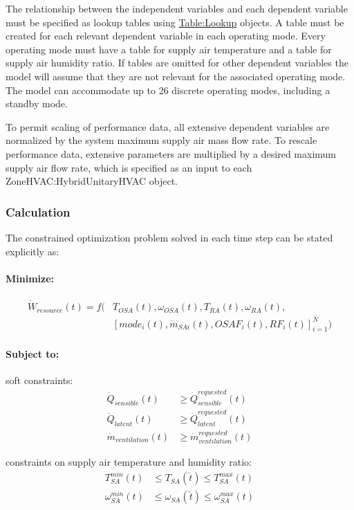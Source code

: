 The relationship between the independent variables and each dependent variable must be specified as lookup tables using \hyperref[table-lookup]{Table:Lookup} objects. A table must be created for each relevant dependent variable in each operating mode. Every operating mode must have a table for supply air temperature and a table for supply air humidity ratio. If tables are omitted for other dependent variables the model will assume that they are not relevant for the associated operating mode. The model can accommodate up to 26 discrete operating modes, including a standby mode.

To permit scaling of performance data, all extensive dependent variables are normalized by the system maximum supply air mass flow rate.  To rescale performance data, extensive parameters are multiplied by a desired maximum supply air flow rate, which is specified as an input to each ZoneHVAC:HybridUnitaryHVAC object.

\subsubsection{Calculation}

The constrained optimization problem solved in each time step can be stated explicitly as:

\paragraph{Minimize:}
\begin{align}
 \dot{W}_{resource}(t) = f( & T_{OSA}(t), \omega_{OSA}(t), T_{RA}(t), \omega_{RA}(t), \nonumber \\
                            & [ mode_{i}(t), \dot{m}_{SAi}(t), OSAF_{i}(t), RF_{i}(t) ]_{i=1}^{N} )
\end{align}

\paragraph{Subject to:}

soft constraints:
\begin{align}
	\dot{Q}_{sensible}(t) & \geq \dot{Q}_{sensible}^{requested}(t) \\
	\dot{Q}_{latent}(t)   & \geq \dot{Q}_{latent}^{requested}(t) \\
	\dot{m}_{ventilation}(t) & \geq \dot{m}_{ventilation}^{requested}(t)
\end{align}

constraints on supply air temperature and humidity ratio:
\begin{align}
	T_{SA}^{min}(t)      & \leq T_{SA}(\check{t})      \leq T_{SA}^{max}(t) \\
	\omega_{SA}^{min}(t) & \leq \omega_{SA}(\check{t}) \leq \omega_{SA}^{max}(t)
\end{align}

